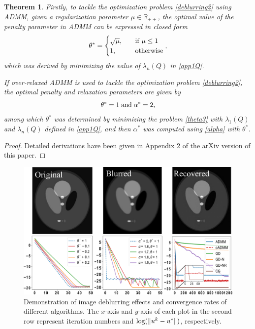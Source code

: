 \documentclass[letterpaper]{article} %
\newtheorem{theorem}{Theorem}
\begin{document}
\begin{theorem}
Firstly, to tackle the optimization problem \eqref{deblurring2} using ADMM, given a regularization parameter $\mu\in \mathbb{R}_{++}$, the optimal value of the penalty parameter in ADMM can be expressed in closed form
\begin{equation*}
	\theta^*=
	\begin{cases}
		\sqrt{\mu},\quad & {\rm{if}}\;\mu \leq 1 \\
		1,\quad & \text{otherwise}
	\end{cases},
\end{equation*}
which was derived by minimizing the value of $\lambda_n (Q)$ in \eqref{app1Q}.

If over-relaxed ADMM is used to tackle the optimization problem \eqref{deblurring2}, the optimal penalty and relaxation parameters are given by
\begin{equation*}
	\theta^*=1 \; \rm{and} \; \alpha^*=2,
\end{equation*}
among which $\theta^*$ was determined by minimizing the problem \eqref{theta3} with $\lambda_1(Q)$ and $\lambda_n(Q)$ defined in \eqref{app1Q}, and then $\alpha^*$ was computed using \eqref{alpha} with $\theta^*$.
\end{theorem}

\begin{proof}
Detailed derivations have been given in  Appendix 2 of the arXiv version of this paper.
\end{proof}

\begin{figure}[t]
	\centering
        \includegraphics[width=1.0\linewidth]{Figures/n11.pdf}
	\caption{{Demonstration of image deblurring effects and convergence rates of different algorithms. The $x$-axis and $y$-axis of each plot in the second row represent iteration numbers and ${\rm{log}}(\|u^k - u^*\|)$, respectively. } }
	\label{fig:2}
\end{figure}
\end{document}
